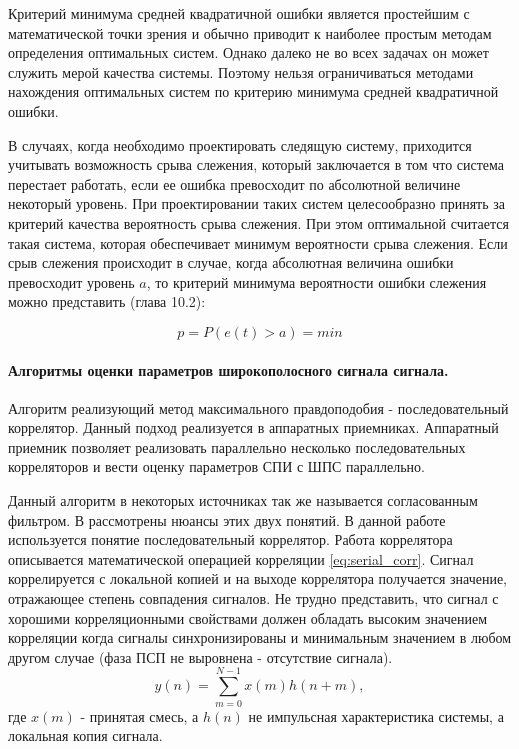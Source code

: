Критерий минимума средней квадратичной ошибки является простейшим с математической точки зрения и обычно приводит
к наиболее простым методам определения оптимальных систем. Однако далеко не во всех задачах он может служить мерой
качества системы. Поэтому нельзя ограничиваться методами нахождения оптимальных систем по критерию минимума средней
квадратичной ошибки.

В случаях, когда необходимо проектировать следящую систему, приходится учитывать возможность срыва слежения,
который заключается в том что система перестает работать, если ее ошибка превосходит по абсолютной величине некоторый
уровень. При проектировании таких систем целесообразно принять за критерий качества вероятность срыва слежения. При
этом оптимальной считается такая система, которая обеспечивает минимум вероятности срыва слежения. Если срыв слежения
происходит в случае, когда абсолютная величина ошибки превосходит уровень $a$, то критерий минимума вероятности ошибки
слежения можно представить \cite{pugachev} (глава 10.2):
\begin{center}
\begin{equation}
	\label{eq:prob_lost_signal}
	p = P(e(t) > a) = min
\end{equation}
\end{center}

\paragraph{Алгоритмы оценки параметров широкополосного сигнала сигнала.}
Алгоритм реализующий метод максимального правдоподобия - последовательный коррелятор. Данный подход реализуется в аппаратных приемниках.
Аппаратный приемник позволяет реализовать параллельно несколько последовательных корреляторов и вести оценку параметров
СПИ с ШПС параллельно.

Данный алгоритм в некоторых источниках так же называется согласованным фильтром. В \cite{sklyar} рассмотрены нюансы этих двух понятий.
В данной работе используется понятие последовательный коррелятор. Работа коррелятора описывается математической операцией
корреляции \ref{eq:serial_corr}. Сигнал коррелируется с локальной копией и на выходе коррелятора получается значение, отражающее
степень совпадения сигналов. Не трудно представить, что сигнал с хорошими корреляционными свойствами должен обладать высоким значением
корреляции когда сигналы синхронизированы и минимальным значением в любом другом случае (фаза ПСП не выровнена - отсутствие сигнала).
\begin{equation}
	\label{eq:serial_corr}
	y(n)=\sum\limits_{m=0}^{N-1}{x(m)h(n+m)},
\end{equation}
где ${x(m)}$ - принятая смесь, а ${h(n)}$ не импульсная характеристика системы, а локальная копия сигнала.

